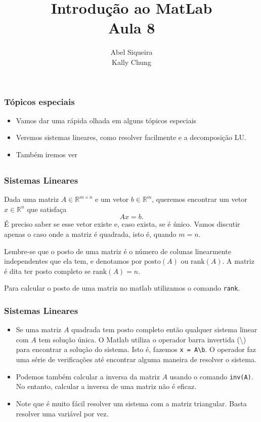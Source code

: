 \documentclass{beamer}
\title{Introdu\c{c}\~ao ao MatLab \\ Aula 8}
\author{Abel Siqueira \\ Kally Chung}
\date{}
\newcommand{\rank}{\mbox{rank}}
\begin{document}
\frame{\titlepage}

\section[T\'opicos especiais]{}

\begin{frame}[fragile]
\frametitle{T\'opicos especiais}

\begin{itemize}
\item<1-> Vamos dar uma r\'apida olhada em alguns t\'opicos especiais
\item<2-> Veremos sistemas lineares, como resolver facilmente e a
decomposi\c{c}\~ao LU.
\item<3-> Tamb\'em iremos ver
\end{itemize}

\end{frame}

\subsection[Sistemas Lineares]{}

\begin{frame}[fragile]
\frametitle{Sistemas Lineares}

Dada uma matriz $A \in \mathbb{R}^{m\times n}$ e um vetor $b \in \mathbb{R}^m$,
queremos encontrar um vetor $x \in \mathbb{R}^n$ que satisfa\c{c}a
$$Ax = b.$$
\pause
\'E preciso saber se esse vetor existe e, caso exista, se \'e \'unico. Vamos
discutir apenas o caso onde a matriz \'e quadrada, isto \'e, quando $m=n$.
\pause

Lembre-se que o posto de uma matriz \'e o n\'umero de colunas linearmente
independentes que ela tem, e denotamos por $\mbox{posto}(A)$ ou
$\mbox{rank}(A)$. A matriz \'e dita ter posto completo se $\rank(A) = n$.
\pause

Para calcular o posto de uma matriz no matlab utilizamos o comando {\tt rank}.
\end{frame}

\begin{frame}[fragile]
\frametitle{Sistemas Lineares}

\begin{itemize}
 \item<1-> Se uma matriz $A$ quadrada tem posto completo ent\~ao qualquer
sistema linear com $A$ tem solu\c{c}\~ao \'unica. O Matlab utiliza o operador
barra invertida (\textbackslash) para encontrar a solu\c{c}\~ao do sistema. Isto
\'e, fazemos \verb+x = A\b+. O operador faz uma s\'erie de verifica\c{c}\~oes
at\'e encontrar alguma maneira de resolver o sistema.

\item<2-> Podemos tamb\'em calcular a inversa da matriz $A$ usando o comando
{\tt inv(A)}. No entanto, calcular a inversa de uma matriz n\~ao \'e eficaz.

\item<3-> Note que \'e muito f\'acil resolver um sistema com a matriz
triangular. Basta resolver uma vari\'avel por vez.
\end{itemize}

\end{frame}
\end{document}
